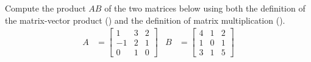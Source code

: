 Compute the product  $AB$ of the two matrices below using both the definition of the matrix-vector product () and the definition of matrix multiplication ().
%
\begin{align*}
A
&=
\begin{bmatrix}
1 & 3 & 2 \\ -1 & 2 & 1 \\ 0 & 1 & 0
\end{bmatrix}
&
B
&=
\begin{bmatrix}
4 & 1 & 2\\ 1 & 0 & 1\\3 & 1 & 5
\end{bmatrix}
\end{align*}
